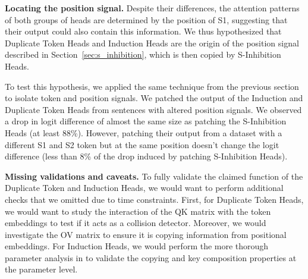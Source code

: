 


\textbf{Locating the position signal.} Despite their differences, the attention patterns of both groups of heads are determined by the position of S1, suggesting that their output could also contain this information. We thus hypothesized that Duplicate Token Heads and Induction Heads are the origin of the position signal described in Section~\ref{sec:s_inhibition}, which is then copied by S-Inhibition Heads. 

To test this hypothesis, we applied the same technique from the previous section to isolate token and position signals. We patched the output of the Induction and Duplicate Token Heads from sentences with altered position signals. We observed a drop in logit difference of almost the same size as patching the S-Inhibition Heads (at least 88\%). However, patching their output from a dataset with a different S1 and S2 token but at the same position doesn’t change the logit difference (less than 8\% of the drop induced by patching S-Inhibition Heads).


\textbf{Missing validations and caveats.} To fully validate the claimed function of the Duplicate Token and Induction Heads, we would want to perform additional checks that we omitted due to time constraints. First, for Duplicate Token Heads, we would want to study the interaction of the QK matrix with the token embeddings to test if it acts as a collision detector. Moreover, we would investigate the OV matrix to ensure it is copying information from positional embeddings.  For Induction Heads, we would perform the more thorough parameter analysis in \cite{elhage2021mathematical} to validate the copying and key composition properties at the parameter level.

